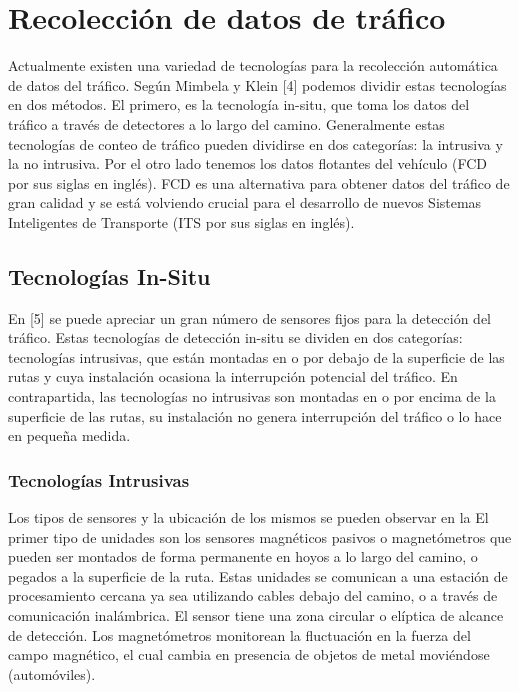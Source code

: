 \chapter{Recolección de datos de tráfico}

Actualmente existen una variedad de tecnologías para la recolección automática de datos del tráfico. Según Mimbela y Klein [4] podemos dividir estas tecnologías en dos métodos. El primero, es la tecnología in-situ, que toma los datos del tráfico a través de detectores a lo largo del camino. Generalmente estas tecnologías de conteo de tráfico pueden dividirse en dos categorías: la intrusiva y la no intrusiva. Por el otro lado tenemos los datos flotantes del vehículo (FCD por sus siglas en inglés). FCD es una alternativa para obtener datos del tráfico de gran calidad y se está volviendo crucial para el desarrollo de nuevos Sistemas Inteligentes de Transporte (ITS por sus siglas en inglés).

\section{Tecnologías In-Situ}

En [5] se puede apreciar un gran número de sensores fijos para la detección del tráfico. Estas tecnologías de detección in-situ se dividen en dos categorías: tecnologías intrusivas, que están montadas en o por debajo de la superficie de las rutas y cuya instalación ocasiona la interrupción potencial del tráfico. En contrapartida, las tecnologías no intrusivas son montadas en o por encima de la superficie de las rutas, su instalación no genera interrupción del tráfico o lo hace en pequeña medida. 

\subsection{Tecnologías Intrusivas}

Los tipos de sensores y la ubicación de los mismos se pueden observar en la  El primer tipo de unidades son los sensores magnéticos pasivos o magnetómetros que pueden ser montados de forma permanente en hoyos a lo largo del camino, o pegados a la superficie de la ruta. Estas unidades se comunican a una estación de procesamiento cercana ya sea utilizando cables debajo del camino, o a través de comunicación inalámbrica. El sensor tiene una zona circular o elíptica de alcance de detección. Los magnetómetros monitorean la fluctuación en la fuerza del campo magnético, el cual cambia en presencia de objetos de metal moviéndose (automóviles).

